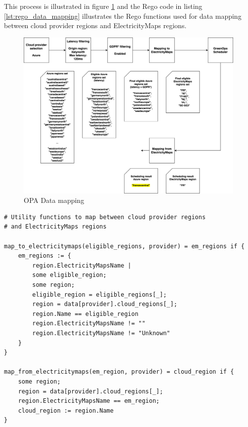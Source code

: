 This process is illustrated in figure \ref{fig:data_mapping} and the Rego code in listing \ref{lst:rego_data_mapping} illustrates the Rego functions used for data mapping between cloud provider regions and ElectricityMaps regions. \newline

\begin{figure}[htb]
  \centering
  \includegraphics[width=1\linewidth]{images/data_mapping.png}
  \caption{OPA Data mapping}
  \label{fig:data_mapping}
\end{figure}

\begin{lstlisting}[language=Rego, caption=Rego data mapping, label=lst:rego_data_mapping]
# Utility functions to map between cloud provider regions 
# and ElectricityMaps regions

map_to_electricitymaps(eligible_regions, provider) = em_regions if {
    em_regions := {
        region.ElectricityMapsName |                             
        some eligible_region;                       
        some region;                                
        eligible_region = eligible_regions[_];      
        region = data[provider].cloud_regions[_];   
        region.Name == eligible_region             
        region.ElectricityMapsName != ""            
        region.ElectricityMapsName != "Unknown"
    }
}

map_from_electricitymaps(em_region, provider) = cloud_region if {
    some region;                              
    region = data[provider].cloud_regions[_];   
    region.ElectricityMapsName == em_region;    
    cloud_region := region.Name 
}

\end{lstlisting}

